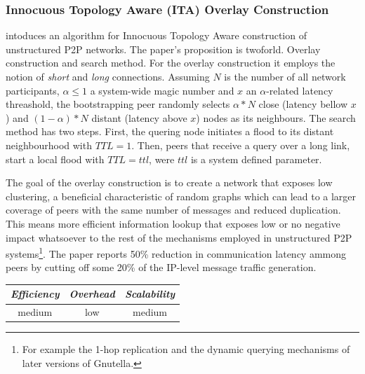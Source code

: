 \subsubsection{Innocuous Topology Aware (ITA) Overlay Construction}
\cite{prfm_ita_2009} intoduces an algorithm for Innocuous Topology Aware
construction of unstructured P2P networks. The paper's proposition is twoforld.
Overlay construction and search method. For the overlay construction it employs
the notion of \emph{short} and \emph{long} connections. Assuming $N$ is the
number of all network participants, $\alpha \leq 1 $ a system-wide magic number
and $x$ an $\alpha$-related latency threashold, the bootstrapping peer randomly
selects $\alpha \ast N$ close (latency bellow $x$) and
$\left( 1 - \alpha \right) \ast N$ distant (latency above $x$) nodes as its
neighbours. The search method has two steps. First, the quering node initiates a
flood to its distant neighbourhood with $TTL = 1$. Then, peers that receive a
query over a long link, start a local flood with $TTL = ttl$, were $ttl$ is a
system defined parameter.

The goal of the overlay construction is to create a network that exposes low
clustering, a beneficial characteristic of random graphs which can lead to a
larger coverage of peers with the same number of messages and reduced
duplication. This means more efficient information lookup that exposes low or no
negative impact whatsoever to the rest of the mechanisms employed in
unstructured P2P systems\footnote{For example the 1-hop replication and the
dynamic querying mechanisms of later versions of Gnutella.}. The paper reports
50\% reduction in communication latency ammong peers by cutting off some 20\% of
the IP-level message traffic generation.

\begin{center}
\begin{tabular}{ccc}
\emph{Efficiency} & \emph{Overhead} & \emph{Scalability} \\
\hline
medium &
low &
medium
\end{tabular}
\end{center}

